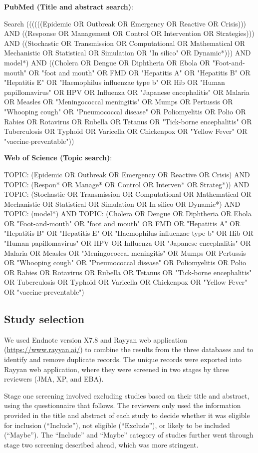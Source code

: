 \documentclass[10pt,letterpaper]{article}
\begin{document}
\textbf{PubMed (Title and abstract search)}:

Search ((((((Epidemic OR Outbreak OR Emergency OR Reactive OR Crisis))) AND ((Response OR Management OR Control OR Intervention OR Strategies))) AND ((Stochastic OR Transmission OR Computational OR Mathematical OR Mechanistic OR Statistical OR Simulation OR "In silico" OR Dynamic*))) AND model*) AND ((Cholera OR Dengue OR Diphtheria OR Ebola OR "Foot-and-mouth" OR "foot and mouth" OR FMD OR "Hepatitis A" OR "Hepatitis B" OR "Hepatitis E" OR "Haemophilus influenzae type b" OR Hib OR "Human papillomavirus" OR HPV OR Influenza OR "Japanese encephalitis" OR Malaria OR Measles OR "Meningococcal meningitis" OR Mumps OR Pertussis OR "Whooping cough" OR "Pneumococcal disease" OR Poliomyelitis OR Polio OR Rabies OR Rotavirus OR Rubella OR Tetanus OR "Tick-borne encephalitis" OR Tuberculosis OR Typhoid OR Varicella OR Chickenpox OR "Yellow Fever" OR "vaccine-preventable"))

\textbf{Web of Science (Topic search)}:

TOPIC: (Epidemic OR Outbreak OR Emergency OR Reactive OR Crisis) AND TOPIC: (Respon* OR  Manage*  OR  Control  OR  Interven*  OR  Strateg*)) AND TOPIC: (Stochastic OR Transmission OR Computational OR Mathematical OR Mechanistic OR Statistical OR Simulation OR In silico OR Dynamic*) AND TOPIC: (model*) AND TOPIC: (Cholera OR Dengue OR Diphtheria OR Ebola OR "Foot-and-mouth" OR "foot and mouth" OR FMD OR "Hepatitis A" OR "Hepatitis B" OR "Hepatitis E" OR "Haemophilus influenzae type b" OR Hib OR "Human papillomavirus" OR HPV OR Influenza OR "Japanese encephalitis" OR Malaria OR Measles OR "Meningococcal meningitis" OR Mumps OR Pertussis OR "Whooping cough" OR "Pneumococcal disease" OR Poliomyelitis OR Polio OR Rabies OR Rotavirus OR Rubella OR Tetanus OR "Tick-borne encephalitis" OR Tuberculosis OR Typhoid OR Varicella OR Chickenpox OR "Yellow Fever" OR "vaccine-preventable")


\subsection*{Study selection}
We used Endnote version X7.8 and Rayyan web application (\url{https://www.rayyan.ai/}) to combine the results from the three databases and to identify and remove duplicate records. The unique records were exported into Rayyan web application, where they were screened in two stages by three reviewers (JMA, XP, and EBA). 

Stage one screening involved excluding studies based on their title and abstract, using the questionnaire that follows. The reviewers only used the information provided in the title and abstract of each study to decide whether it was eligible for inclusion (``Include''), not eligible (``Exclude''), or likely to be included (``Maybe''). The ``Include'' and ``Maybe'' category of studies further went through stage two screening described ahead, which was more stringent. 
\end{document}

